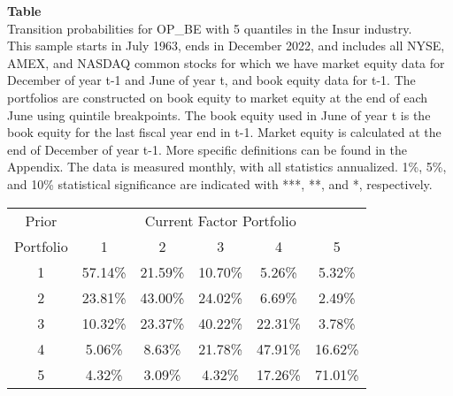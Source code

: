 \begin{table*}[ht!]
\raggedright
{}
\label{tab: transition_probs_OP_BE_Insur_with_5_quantiles}
\textbf{Table \thetable} \\
Transition probabilities for OP_BE with 5 quantiles in the Insur industry. \\
\hspace*{1em}This sample starts in July 1963, ends in December 2022, and includes all NYSE, AMEX, and NASDAQ common stocks for which we have market equity data for December of year t-1 and June of year t, and book equity data for t-1. The portfolios are constructed on book equity to market equity at the end of each June using quintile breakpoints.  The book equity used in June of year t is the book equity for the last fiscal year end in t-1.  Market equity is calculated at the end of December of year t-1.  More specific definitions can be found in the Appendix.  The data is measured monthly, with all statistics annualized.  1\%, 5\%, and 10\% statistical significance are indicated with ***, **, and *, respectively. \\
\vspace{0.5em}
\centering
\begin{adjustbox}{max width=\textwidth}
\begin{tabular}{@{}cccccc@{}}
\toprule
Prior & \multicolumn{5}{c}{Current Factor Portfolio} \\
Portfolio & 1 & 2 & 3 & 4 & 5 \\
\midrule
1 & 57.14\% & 21.59\% & 10.70\% & 5.26\% & 5.32\% \\
2 & 23.81\% & 43.00\% & 24.02\% & 6.69\% & 2.49\% \\
3 & 10.32\% & 23.37\% & 40.22\% & 22.31\% & 3.78\% \\
4 & 5.06\% & 8.63\% & 21.78\% & 47.91\% & 16.62\% \\
5 & 4.32\% & 3.09\% & 4.32\% & 17.26\% & 71.01\% \\
\bottomrule
\end{tabular}
\end{adjustbox}
\end{table*}